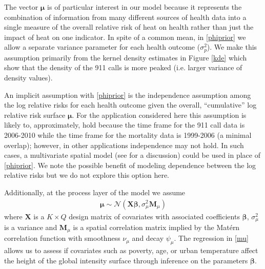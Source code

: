 \documentclass[final]{statsoc}
\begin{document}
The vector $\boldsymbol\mu$ is of particular interest in our model because it represents
the combination of information from many different sources of health data into
a single measure of the overall relative risk of heat on 
health rather than just the impact of heat on one indicator. In spite of a common mean, 
in \eqref{phiprior} we allow a separate variance parameter for each health outcome 
($\sigma^2_p$). We make this assumption primarily from the kernel density estimates 
in Figure \ref{kde} which 
show that the density of the 911 calls is more peaked (i.e. larger variance of density values).

An implicit assumption with \eqref{phiprior} is the independence assumption among the log relative risks for each health outcome given the overall, ``cumulative'' log relative risk surface $\boldsymbol{\mu}$. For the application considered here this assumption is likely to, approximately, hold because the time frame for the 911 call data is 2006-2010 while the time frame for the mortality data is 1999-2006 (a minimal overlap); however, in other applications independence may not hold. In such cases, a multivariate spatial model (see \cite{Genton2015} for a discussion) could be used in place of \eqref{phiprior}. We note the possible benefit of modeling dependence between the log relative risks but we do not explore this option here.

Additionally, at the process layer of the model we assume 
\begin{align}
\boldsymbol{\mu} \sim \mathcal{N}(\mathbf{X}\boldsymbol{\beta},\sigma^2_\mu\mathbf{M}_\mu)
\label{mu}
\end{align}
where $\mathbf{X}$ is a $K\times Q$ design matrix of covariates with associated coefficients 
$\boldsymbol{\beta}$, $\sigma^2_\mu$ is a variance and $\mathbf{M}_\mu$ is a spatial correlation 
matrix implied by the Mat\'{e}rn correlation function with smoothness $\nu_\mu$ and 
decay $\psi_\mu$. The regression in \eqref{mu} allows us to assess if covariates such as 
poverty, age, or urban temperature affect the height of the global intensity surface 
through inference on the parameters $\boldsymbol{\beta}$.
\end{document}
